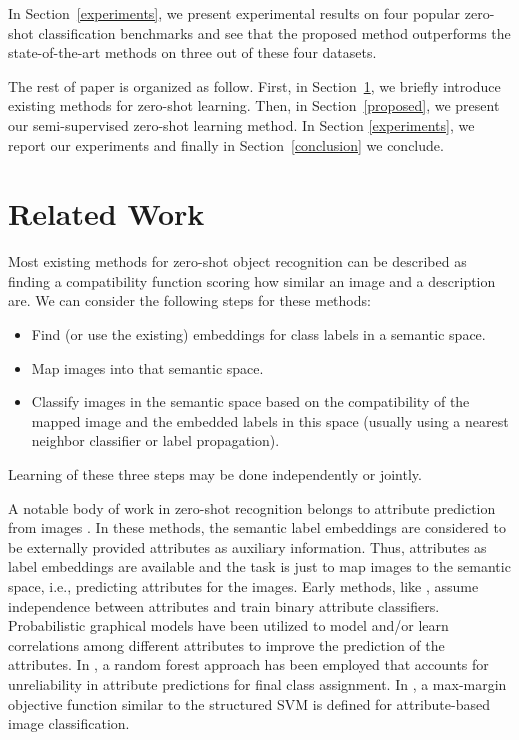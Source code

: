 \documentclass[10pt,twocolumn,letterpaper]{article}
\begin{document}
In Section~\ref{experiments}, we present experimental results on four popular zero-shot classification benchmarks and see that the proposed method outperforms the state-of-the-art methods on three out of these four datasets.

The rest of paper is organized as follow. First, in Section~\ref{related}, we briefly introduce existing methods for zero-shot learning.
Then, in Section~\ref{proposed}, we present our semi-supervised zero-shot learning method. In Section \ref{experiments}, we report our experiments and finally in Section~\ref{conclusion}
we conclude.

\section{Related Work} \label{related}
Most existing methods for zero-shot object recognition can be described as finding a compatibility function scoring how
similar an image and a description are.
We can consider the following steps for these methods:
\begin{itemize}
  \item Find (or use the existing) embeddings for class labels in a semantic space.
  \item Map images into that semantic space.
  \item Classify images in the semantic space based on the compatibility of the mapped image and the embedded labels in this space (usually using a nearest neighbor classifier or label propagation).
\end{itemize}
Learning of these three steps may be done independently or jointly.

A notable body of work in zero-shot recognition belongs to attribute prediction from images \cite{lampert09, topicmodel, ajoint11, unified13, suzuki14}.
In these methods, the semantic label embeddings are considered to be externally provided attributes as auxiliary information. Thus, attributes as label embeddings are available and the task is just to map images to the semantic space, i.e., predicting attributes for the images.
Early methods, like \cite{lampert09}, assume independence between attributes and train binary attribute classifiers.
Probabilistic graphical models have been utilized to model and/or learn correlations among different attributes \cite{topicmodel, unified13} to improve the prediction of the attributes.
In \cite{jayaraman14}, a random forest approach has been employed that accounts for unreliability in attribute predictions for final class assignment.
In \cite{Akata2015pami}, a max-margin objective function similar to the structured SVM is defined for attribute-based image classification.
\end{document}
